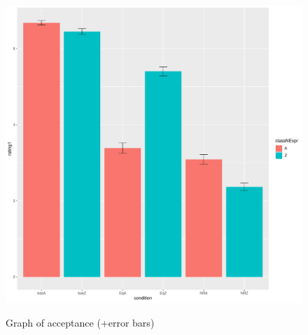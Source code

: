 \documentclass[
  ignorenonframetext,
]{beamer}
\begin{document}
\begin{frame}
\begin{figure}

{\centering 

\href{fig-error-bar}{\includegraphics{error_bar_without_prob-eps-converted-to.pdf}}

}

\caption{Graph of acceptance (+error bars)}

\end{figure}
\end{frame}
\end{document}
